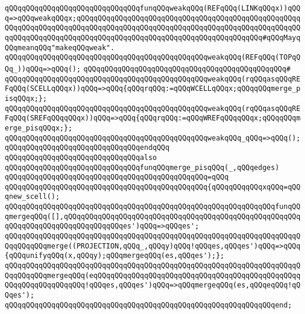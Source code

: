 \verb|qQQqqQQqqQQqqQQqqQQqqQQqqQQqqQQqfunqQQqweakqQQq(REFqQQq(LINKqQQqx))qQQq=>qQQqweakqQQqx;qQQqqQQqqQQqqQQqqQQqqQQqqQQqqQQqqQQqqQQqqQQqqQQqqQQqqQQqqQQqqQQqqQQqqQQqqQQqqQQqqQQqqQQqqQQqqQQqqQQqqQQqqQQqqQQqqQQqqQQqqQQqqQQqqQQqqQQqqQQqqQQqqQQqqQQqqQQqqQQqqQQqqQQqqQQqqQQqqQQqqQQq#qQQqMayqQQqmeanqQQq"makeqQQqweak".|\newline
\verb|qQQqqQQqqQQqqQQqqQQqqQQqqQQqqQQqqQQqqQQqqQQqqQQqweakqQQq(REFqQQq(TOPqQQq_))qQQq=>qQQq();|\newline
\verb|qQQqqQQqqQQqqQQqqQQqqQQqqQQqqQQqqQQqqQQqqQQqqQQq#|\newline
\verb|qQQqqQQqqQQqqQQqqQQqqQQqqQQqqQQqqQQqqQQqqQQqqQQqweakqQQq(rqQQqasqQQqREFqQQq(SCELLqQQqx))qQQq=>qQQq{qQQqrqQQq:=qQQqWCELLqQQqx;qQQqqQQqmerge_pisqQQqx;};|\newline
\verb|qQQqqQQqqQQqqQQqqQQqqQQqqQQqqQQqqQQqqQQqqQQqqQQqweakqQQq(rqQQqasqQQqREFqQQq(SREFqQQqqQQqx))qQQq=>qQQq{qQQqrqQQq:=qQQqWREFqQQqqQQqx;qQQqqQQqmerge_pisqQQqx;};|\newline
\verb|qQQqqQQqqQQqqQQqqQQqqQQqqQQqqQQqqQQqqQQqqQQqqQQqweakqQQq_qQQq=>qQQq();|\newline
\verb|qQQqqQQqqQQqqQQqqQQqqQQqqQQqqQQqendqQQq|\newline
\newline
\verb|qQQqqQQqqQQqqQQqqQQqqQQqqQQqqQQqalso|\newline
\verb|qQQqqQQqqQQqqQQqqQQqqQQqqQQqqQQqfunqQQqmerge_pisqQQq(_,qQQqedges)|\newline
\verb|qQQqqQQqqQQqqQQqqQQqqQQqqQQqqQQqqQQqqQQqqQQqqQQq=qQQq|\newline
\verb|qQQqqQQqqQQqqQQqqQQqqQQqqQQqqQQqqQQqqQQqqQQqqQQq{qQQqqQQqqQQqxqQQq=qQQqnew_scell();|\newline
\newline
\verb|qQQqqQQqqQQqqQQqqQQqqQQqqQQqqQQqqQQqqQQqqQQqqQQqqQQqqQQqqQQqqQQqfunqQQqmergeqQQq([],qQQqqQQqqQQqqQQqqQQqqQQqqQQqqQQqqQQqqQQqqQQqqQQqqQQqqQQqqQQqqQQqqQQqqQQqqQQqqQQqqQQqes')qQQq=>qQQqes';|\newline
\verb|qQQqqQQqqQQqqQQqqQQqqQQqqQQqqQQqqQQqqQQqqQQqqQQqqQQqqQQqqQQqqQQqqQQqqQQqqQQqqQQqmerge((PROJECTION,qQQq_,qQQqy)qQQq!qQQqes,qQQqes')qQQq=>qQQq{qQQqunifyqQQq(x,qQQqy);qQQqmergeqQQq(es,qQQqes');};|\newline
\verb|qQQqqQQqqQQqqQQqqQQqqQQqqQQqqQQqqQQqqQQqqQQqqQQqqQQqqQQqqQQqqQQqqQQqqQQqqQQqqQQqmergeqQQq(eqQQqqQQqqQQqqQQqqQQqqQQqqQQqqQQqqQQqqQQqqQQqqQQqqQQqqQQqqQQqqQQqqQQq!qQQqes,qQQqes')qQQq=>qQQqmergeqQQq(es,qQQqeqQQq!qQQqes');|\newline
\verb|qQQqqQQqqQQqqQQqqQQqqQQqqQQqqQQqqQQqqQQqqQQqqQQqqQQqqQQqqQQqqQQqend;|\newline
